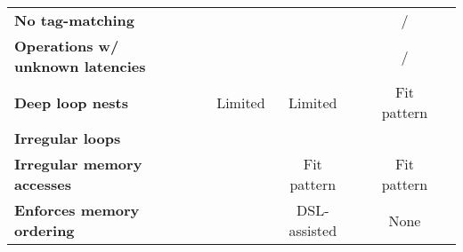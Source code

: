 {\begin{table}[htb]
{\begin{tabular}{p{3cm}|ccccc|c}
				\bf No tag-matching &
				\cmark & \xmark & \cmark & \xmark & \cmark/\xmark & \cmark
			\\[.5ex]
				\bf Operations w/ \newline unknown latencies &
				\xmark & \xmark & \cmark & \cmark & \cmark/\xmark & \cmark	
			\\[.5ex]
				\bf Deep loop nests &
				\cmark & Limited & Limited & \cmark & Fit pattern & \cmark	
			\\[.5ex]
				\bf Irregular loops &
				\xmark & \xmark & \xmark & \cmark & \xmark & \cmark	
			\\[.5ex]
				\bf Irregular memory \newline accesses &
				\xmark & \xmark & Fit pattern & \cmark & Fit pattern & \cmark	
			\\[.5ex]
				\bf Enforces memory \newline ordering &
				\xmark & \xmark & DSL-assisted & \cmark & None & \cmark
			\\[.5ex]
			\bottomrule
		 \end{tabular}
	}
	\end{table}
}

